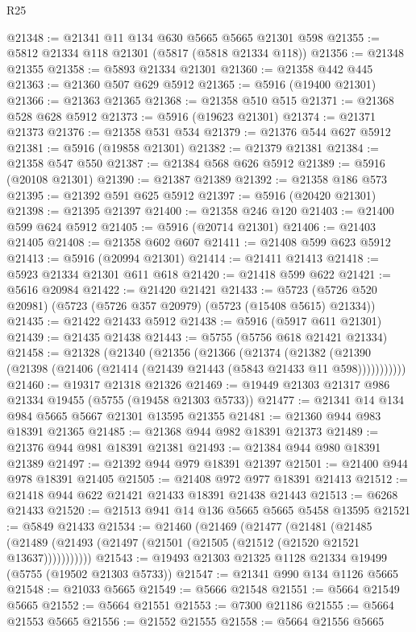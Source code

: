\begin{lexlean}{R25}
\begin{coremodule}
@21348 := @21341 @11 @134 @630 @5665 @5665 @21301 @598
@21355 := @5812 @21334 @118 @21301 (@5817 (@5818 @21334 @118))
@21356 := @21348 @21355
@21358 := @5893 @21334 @21301
@21360 := @21358 @442 @445
@21363 := @21360 @507 @629 @5912
@21365 := @5916 (@19400 @21301)
@21366 := @21363 @21365
@21368 := @21358 @510 @515
@21371 := @21368 @528 @628 @5912
@21373 := @5916 (@19623 @21301)
@21374 := @21371 @21373
@21376 := @21358 @531 @534
@21379 := @21376 @544 @627 @5912
@21381 := @5916 (@19858 @21301)
@21382 := @21379 @21381
@21384 := @21358 @547 @550
@21387 := @21384 @568 @626 @5912
@21389 := @5916 (@20108 @21301)
@21390 := @21387 @21389
@21392 := @21358 @186 @573
@21395 := @21392 @591 @625 @5912
@21397 := @5916 (@20420 @21301)
@21398 := @21395 @21397
@21400 := @21358 @246 @120
@21403 := @21400 @599 @624 @5912
@21405 := @5916 (@20714 @21301)
@21406 := @21403 @21405
@21408 := @21358 @602 @607
@21411 := @21408 @599 @623 @5912
@21413 := @5916 (@20994 @21301)
@21414 := @21411 @21413
@21418 := @5923 @21334 @21301 @611 @618
@21420 := @21418 @599 @622
@21421 := @5616 @20984
@21422 := @21420 @21421
@21433 := @5723 (@5726 @520 @20981) (@5723 (@5726 @357 @20979) (@5723 (@15408 @5615) @21334))
@21435 := @21422 @21433 @5912
@21438 := @5916 (@5917 @611 @21301)
@21439 := @21435 @21438
@21443 := @5755 (@5756 @618 @21421 @21334)
@21458 := @21328
    (@21340
      (@21356
        (@21366
          (@21374
            (@21382 (@21390 (@21398 (@21406 (@21414 (@21439 @21443 (@5843 @21433 @11 @598)))))))))))
@21460 := @19317 @21318 @21326
@21469 := @19449 @21303 @21317 @986 @21334 @19455 (@5755 (@19458 @21303 @5733))
@21477 := @21341 @14 @134 @984 @5665 @5667 @21301 @13595 @21355
@21481 := @21360 @944 @983 @18391 @21365
@21485 := @21368 @944 @982 @18391 @21373
@21489 := @21376 @944 @981 @18391 @21381
@21493 := @21384 @944 @980 @18391 @21389
@21497 := @21392 @944 @979 @18391 @21397
@21501 := @21400 @944 @978 @18391 @21405
@21505 := @21408 @972 @977 @18391 @21413
@21512 := @21418 @944 @622 @21421 @21433 @18391 @21438 @21443
@21513 := @6268 @21433
@21520 := @21513 @941 @14 @136 @5665 @5665 @5458 @13595
@21521 := @5849 @21433
@21534 := @21460
    (@21469
      (@21477
        (@21481
          (@21485 (@21489 (@21493 (@21497 (@21501 (@21505 (@21512 (@21520 @21521 @13637)))))))))))
@21543 := @19493 @21303 @21325 @1128 @21334 @19499 (@5755 (@19502 @21303 @5733))
@21547 := @21341 @990 @134 @1126 @5665
@21548 := @21033 @5665
@21549 := @5666 @21548
@21551 := @5664 @21549 @5665
@21552 := @5664 @21551
@21553 := @7300 @21186
@21555 := @5664 @21553 @5665
@21556 := @21552 @21555
@21558 := @5664 @21556 @5665

\end{coremodule}
\end{lexlean}
